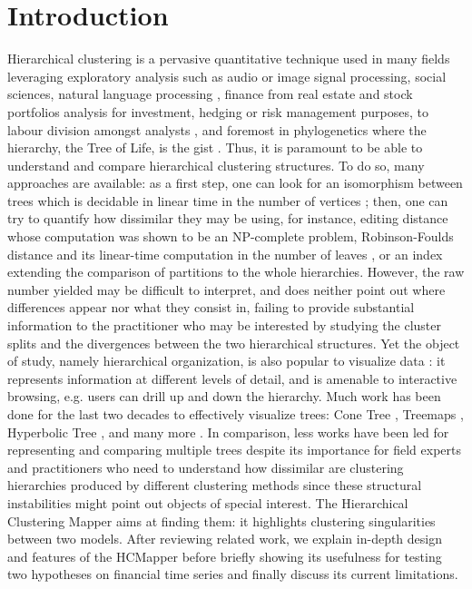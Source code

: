 \documentclass[10pt,conference,a4paper]{IEEEtran}
\begin{document}
\section{Introduction}
Hierarchical clustering is a pervasive quantitative technique used in many fields leveraging exploratory analysis such as audio \cite{journals/taslp/EssidRD06} or image \cite{garcia2010levels} signal processing, social sciences, natural language processing \cite{ushioda1996hierarchical,glover2002inferring}, finance from real estate \cite{hepsen2012using} and stock \cite{tumminello2010correlation} portfolios analysis for investment, hedging or risk management purposes, to labour division amongst analysts \cite{yaros2013crowdsourced},
and foremost in phylogenetics where the hierarchy, the Tree of Life, is the gist \cite{blanchette2012inference,ailon2005fitting}.
Thus, it is paramount to be able to understand and compare hierarchical clustering structures. To do so, many approaches are available: as a first step, one can look for an isomorphism between trees which is decidable in linear time in the number of vertices \cite{IsoTree}; then, one can try to quantify how dissimilar they may be using, for instance, editing distance \cite{zhang1992editing} whose computation was shown to be an NP-complete problem, Robinson-Foulds distance \cite{robinson1981comparison} and its linear-time computation in the number of leaves \cite{day1985optimal}, or an index \cite{morlini2012dissimilarity} extending the comparison of partitions \cite{hubert1985comparing} to the whole hierarchies. However, the raw number yielded may be difficult to interpret, and does neither point out where differences appear nor what they consist in, failing to provide substantial information to the practitioner who may be interested by studying the cluster splits and the divergences between the two hierarchical structures.
Yet the object of study, namely hierarchical organization, is also popular to visualize data \cite{elmqvist2010hierarchical}: it represents information at different levels of detail, and is amenable to interactive browsing, e.g. users can drill up and down the hierarchy. Much work has been done for the last two decades to effectively visualize trees: Cone Tree \cite{robertson1991cone}, Treemaps \cite{johnson1991tree,balzer2005voronoi}, Hyperbolic Tree \cite{lamping1995focus+}, and many more \cite{jurgensmann2010poster}.
In comparison, less works have been led for representing and comparing multiple trees \cite{graham2010survey} despite its importance for field experts and practitioners who need to understand how dissimilar are clustering hierarchies produced by different clustering methods since these structural instabilities might point out objects of special interest.
The Hierarchical Clustering Mapper aims at finding them: it highlights clustering singularities between two models.
After reviewing related work, we explain in-depth design and features of the HCMapper before briefly showing its usefulness for testing two hypotheses on financial time series and finally discuss its current limitations.
\end{document}

